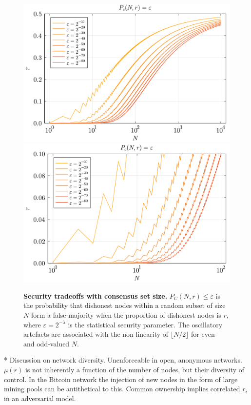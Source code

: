 \begin{figure}
	\includegraphics[width=\columnwidth]{figs/majority_prob.pdf}\\
	\includegraphics[width=\columnwidth]{figs/majority_prob_zoom.pdf}
	\caption{\textbf{Security tradeoffs with consensus set size.} $P_C(N,r)\leq\varepsilon$ is the probability that dishonest nodes within a random subset of size $N$ form a false-majority when the proportion of dishonest nodes is $r$, where $\varepsilon=2^{-\lambda}$ is the statistical security parameter. The oscillatory artefacts are associated with the non-linearity of \mbox{$\lfloor N/2\rfloor$} for even- and odd-valued $N$.} \label{fig:P_M}
\end{figure}

* Discussion on network diversity. Unenforceable in open, anonymous networks. $\mu(r)$ is not inherently a function of the number of nodes, but their diversity of control. In the Bitcoin network the injection of new nodes in the form of large mining pools can be antithetical to this. Common ownership implies correlated $r_i$ in an adversarial model.

